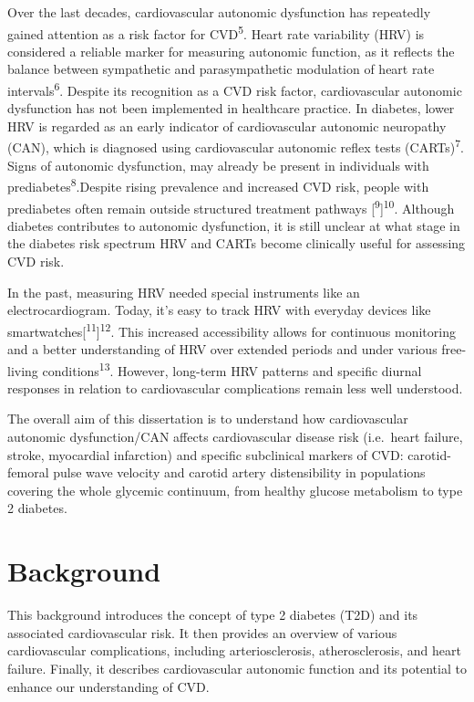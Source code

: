 \documentclass[
  a4paper,
  headsepline=true,
  open=any]{scrbook}
\begin{document}
Over the last decades, cardiovascular autonomic dysfunction has
repeatedly gained attention as a risk factor for CVD\textsuperscript{5}.
Heart rate variability (HRV) is considered a reliable marker for
measuring autonomic function, as it reflects the balance between
sympathetic and parasympathetic modulation of heart rate
intervals\textsuperscript{6}. Despite its recognition as a CVD risk
factor, cardiovascular autonomic dysfunction has not been implemented in
healthcare practice. In diabetes, lower HRV is regarded as an early
indicator of cardiovascular autonomic neuropathy (CAN), which is
diagnosed using cardiovascular autonomic reflex tests
(CARTs)\textsuperscript{7}. Signs of autonomic dysfunction, may already
be present in individuals with prediabetes\textsuperscript{8}.Despite
rising prevalence and increased CVD risk, people with prediabetes often
remain outside structured treatment pathways
{[}\textsuperscript{9}{]}\textsuperscript{10}. Although diabetes
contributes to autonomic dysfunction, it is still unclear at what stage
in the diabetes risk spectrum HRV and CARTs become clinically useful for
assessing CVD risk.

In the past, measuring HRV needed special instruments like an
electrocardiogram. Today, it's easy to track HRV with everyday devices
like smartwatches{[}\textsuperscript{11}{]}\textsuperscript{12}. This
increased accessibility allows for continuous monitoring and a better
understanding of HRV over extended periods and under various free-living
conditions\textsuperscript{13}. However, long-term HRV patterns and
specific diurnal responses in relation to cardiovascular complications
remain less well understood.

The overall aim of this dissertation is to understand how cardiovascular
autonomic dysfunction/CAN affects cardiovascular disease risk
(i.e.~heart failure, stroke, myocardial infarction) and specific
subclinical markers of CVD: carotid-femoral pulse wave velocity and
carotid artery distensibility in populations covering the whole glycemic
continuum, from healthy glucose metabolism to type 2 diabetes.


\hypertarget{background}{%
\chapter{Background}\label{background}}

This background introduces the concept of type 2 diabetes (T2D) and its
associated cardiovascular risk. It then provides an overview of various
cardiovascular complications, including arteriosclerosis,
atherosclerosis, and heart failure. Finally, it describes cardiovascular
autonomic function and its potential to enhance our understanding of
CVD.
\end{document}
